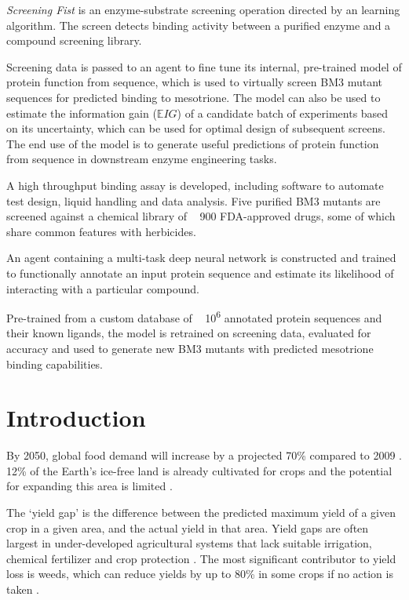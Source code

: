 \documentclass[16pt]{book}
\begin{document}
\textit{Screening Fist} is an enzyme-substrate screening operation directed by an learning algorithm.
The screen detects binding activity between a purified enzyme and a compound screening library.

Screening data is passed to an agent to fine tune its internal, pre-trained model of protein function from sequence, which is used to virtually screen BM3 mutant sequences for predicted binding to mesotrione.
The model can also be used to estimate the information gain ($\mathbb{E}IG$) of a candidate batch of experiments based on its uncertainty, which can be used for optimal design of subsequent screens.
The end use of the model is to generate useful predictions of protein function from sequence in downstream enzyme engineering tasks.

A high throughput binding assay is developed, including software to automate test design, liquid handling and data analysis.
Five purified BM3 mutants are screened against a chemical library of ~ 900 FDA-approved drugs, some of which share common features with herbicides.

An agent containing a multi-task deep neural network is constructed and trained to functionally annotate an input protein sequence and estimate its likelihood of interacting with a particular compound.

Pre-trained from a custom database of ~ 10\textsuperscript{6} annotated protein sequences and their known ligands, the model is retrained on screening data, evaluated for accuracy and used to generate new BM3 mutants with predicted mesotrione binding capabilities.

\section{Introduction}
By 2050, global food demand will increase by a projected 70\% compared to 2009 \cite{food2009high}. 
12\% of the Earth’s ice-free land is already cultivated for crops and the potential for expanding this area is limited \cite{licker2010mind}\cite{food2009high}.
 
The ‘yield gap’ is the difference between the predicted maximum yield of a given crop in a given area, and the actual yield in that area. 
Yield gaps are often largest in under-developed agricultural systems that lack suitable irrigation, chemical fertilizer and crop protection \cite{licker2010mind}. 
The most significant contributor to yield loss is weeds, which can reduce yields by up to 80\% in some crops if no action is taken \cite{oerke2006crop}. 
\end{document}
